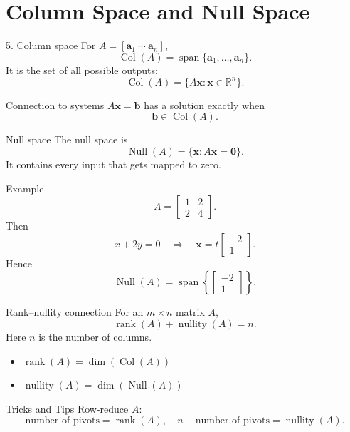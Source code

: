 \documentclass[aspectratio=169,11pt]{beamer}
\newcommand{\R}{\mathbb{R}}
\newcommand{\vect}[1]{\bm{#1}}
\begin{document}
\section{Column Space and Null Space}
\begin{frame}{5. Column space}
For $A=[\vect a_1\ \cdots\ \vect a_n]$,
\[
\operatorname{Col}(A)=\operatorname{span}\{\vect a_1,\ldots,\vect a_n\}.
\]
It is the set of all possible outputs:
\[
\operatorname{Col}(A)=\{A\vect x:\vect x\in\R^n\}.
\]
\begin{block}{Connection to systems}
$A\vect x=\vect b$ has a solution exactly when
\[
\vect b\in\operatorname{Col}(A).
\]
\end{block}
\end{frame}

\begin{frame}{Null space}
The null space is
\[
\operatorname{Null}(A)=\{\vect x:A\vect x=\vect0\}.
\]
It contains every input that gets mapped to zero.
\begin{exampleblock}{Example}
\[
A=
\begin{bmatrix}1&2\\2&4\end{bmatrix}.
\]
Then
\[
x+2y=0\quad\Rightarrow\quad
\vect x=t\begin{bmatrix}-2\\1\end{bmatrix}.
\]
Hence
\[
\operatorname{Null}(A)=
\operatorname{span}\left\{
\begin{bmatrix}-2\\1\end{bmatrix}\right\}.
\]
\end{exampleblock}
\end{frame}

\begin{frame}{Rank--nullity connection}
For an $m\times n$ matrix $A$,
\[
\boxed{\operatorname{rank}(A)+\operatorname{nullity}(A)=n.}
\]
Here $n$ is the number of columns.
\begin{itemize}
\item $\operatorname{rank}(A)=\dim(\operatorname{Col}(A))$
\item $\operatorname{nullity}(A)=\dim(\operatorname{Null}(A))$
\end{itemize}
\begin{alertblock}{Tricks and Tips}
Row-reduce $A$:
\[
\text{number of pivots}=\operatorname{rank}(A),
\quad
n-\text{number of pivots}=\operatorname{nullity}(A).
\]
\end{alertblock}
\end{frame}
\end{document}
